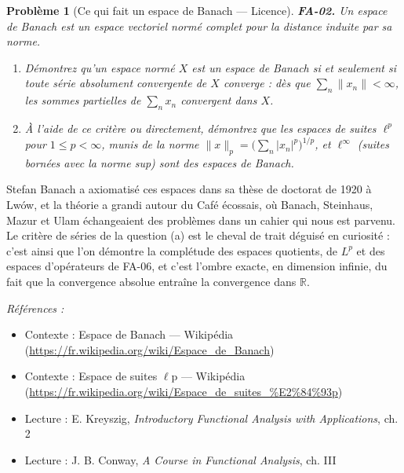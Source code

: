 \documentclass[11pt]{article}
\newtheorem{problem}{Problème}
\newenvironment{refs}{\par\small\noindent\emph{Références :}\begin{itemize}\setlength\itemsep{0pt}}{\end{itemize}\normalsize}
\begin{document}
\bigskip

\begin{problem}[{Ce qui fait un espace de Banach --- Licence}]
\textbf{FA-02.} Un \textit{espace de Banach} est un espace vectoriel normé complet pour la distance
induite par sa norme.
\begin{enumerate}
\item[(a)] Démontrez qu'un espace normé $ X $ est un espace de Banach si et seulement si toute série
absolument convergente de $ X $ converge : dès que $ \sum_n \|x_n\| < \infty $, les sommes
partielles de $ \sum_n x_n $ convergent dans $ X $.
\item[(b)] À l'aide de ce critère ou directement, démontrez que les espaces de suites $ \ell^p $ pour
$ 1 \le p < \infty $, munis de la norme $ \|x\|_p = \big(\sum_n |x_n|^p\big)^{1/p} $, et
$ \ell^\infty $ (suites bornées avec la norme sup) sont des espaces de Banach.
\end{enumerate}

\end{problem}

\noindent Stefan Banach a axiomatisé ces espaces dans sa thèse de doctorat de 1920 à Lwów, et
la théorie a grandi autour du Café écossais, où Banach, Steinhaus, Mazur et Ulam échangeaient des
problèmes dans un cahier qui nous est parvenu. Le critère de séries de la question (a) est le cheval
de trait déguisé en curiosité : c'est ainsi que l'on démontre la complétude des espaces quotients, de
$ L^p $ et des espaces d'opérateurs de FA-06, et c'est l'ombre exacte, en dimension infinie, du fait
que la convergence absolue entraîne la convergence dans $\mathbb{R}$.

\begin{refs}
\item Contexte : Espace de Banach --- Wikipédia (\url{https://fr.wikipedia.org/wiki/Espace_de_Banach})
\item Contexte : Espace de suites $\ell$p --- Wikipédia (\url{https://fr.wikipedia.org/wiki/Espace_de_suites_%E2%84%93p})
\item Lecture : E. Kreyszig, \textit{Introductory Functional Analysis with Applications}, ch. 2
\item Lecture : J. B. Conway, \textit{A Course in Functional Analysis}, ch. III
\end{refs}

\bigskip
\end{document}
